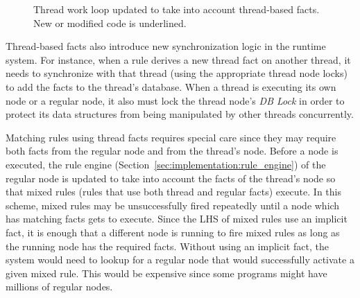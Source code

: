 \begin{figure}
\begin{algorithm}[H]
\end{algorithm}
\caption{Thread work loop updated to take into account thread-based facts.
New or modified code is underlined.}
\label{alg:threads:work_loop}
\end{figure}

Thread-based facts also introduce new synchronization logic in the runtime
system. For instance, when a rule derives a new thread fact on another thread,
it needs to synchronize with that thread (using the appropriate thread node
locks) to add the facts to the thread's database. When a thread is executing its
own node or a regular node, it also must lock the thread node's \emph{DB Lock}
in order to protect its data structures from being manipulated by other threads
concurrently.

Matching rules using thread facts requires special care since they may require
both facts from the regular node and from the thread's node. Before a node is
executed, the rule engine (Section~\ref{sec:implementation:rule_engine}) of the
regular node is updated to take into account the facts of the thread's node so
that mixed rules (rules that use both thread and regular facts) execute. In this
scheme, mixed rules may be unsuccessfully fired repeatedly until a node which
has matching facts gets to execute. Since the LHS of mixed rules use an implicit
 fact, it is enough that a different node is running
to fire mixed rules as long as the running node has the required facts.
Without using an implicit  fact, the system would need to lookup
for a regular node that would successfully activate a given mixed rule. This
would be expensive since some programs might have millions of regular nodes.
